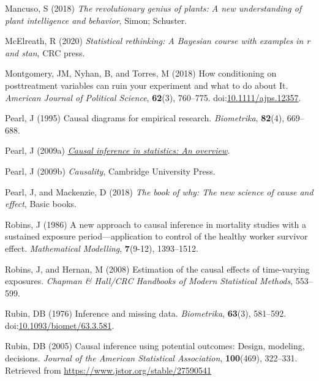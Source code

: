 \documentclass[
  singlecolumn]{article}
\newlength{\cslhangindent}
\newenvironment{CSLReferences}[2] %
 {\begin{list}{}{%
  \setlength{\itemindent}{0pt}
  \setlength{\leftmargin}{0pt}
  \setlength{\parsep}{0pt}
  \ifodd #1
   \setlength{\leftmargin}{\cslhangindent}
   \setlength{\itemindent}{-1\cslhangindent}
  \fi
  \setlength{\itemsep}{#2\baselineskip}}}
 {\end{list}}
\begin{document}
\begin{CSLReferences}{1}{0}
Mancuso, S (2018) \emph{The revolutionary genius of plants: A new
understanding of plant intelligence and behavior}, Simon; Schuster.

McElreath, R (2020) \emph{Statistical rethinking: A {B}ayesian course
with examples in r and stan}, CRC press.

Montgomery, JM, Nyhan, B, and Torres, M (2018) How conditioning on
posttreatment variables can ruin your experiment and what to do about
It. \emph{American Journal of Political Science}, \textbf{62}(3),
760--775.
doi:\href{https://doi.org/10.1111/ajps.12357}{10.1111/ajps.12357}.

Pearl, J (1995) Causal diagrams for empirical research.
\emph{Biometrika}, \textbf{82}(4), 669--688.

Pearl, J (2009a) \emph{\href{https://doi.org/10.1214/09-SS057}{Causal
inference in statistics: An overview}}.

Pearl, J (2009b) \emph{Causality}, Cambridge University Press.

Pearl, J, and Mackenzie, D (2018) \emph{The book of why: The new science
of cause and effect}, Basic books.

Robins, J (1986) A new approach to causal inference in mortality studies
with a sustained exposure period---application to control of the healthy
worker survivor effect. \emph{Mathematical Modelling}, \textbf{7}(9-12),
1393--1512.

Robins, J, and Hernan, M (2008) Estimation of the causal effects of
time-varying exposures. \emph{Chapman \& Hall/CRC Handbooks of Modern
Statistical Methods}, 553--599.

Rubin, DB (1976) Inference and missing data. \emph{Biometrika},
\textbf{63}(3), 581--592.
doi:\href{https://doi.org/10.1093/biomet/63.3.581}{10.1093/biomet/63.3.581}.

Rubin, DB (2005) Causal inference using potential outcomes: Design,
modeling, decisions. \emph{Journal of the American Statistical
Association}, \textbf{100}(469), 322--331. Retrieved from
\url{https://www.jstor.org/stable/27590541}


\end{CSLReferences}
\end{document}
